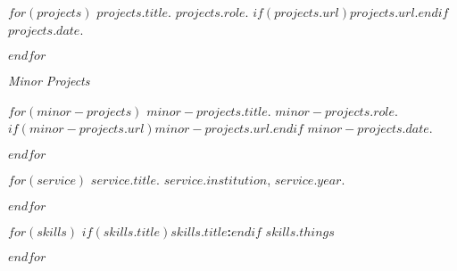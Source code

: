 \documentclass[11pt,article,oneside]{memoir}
\begin{document}
$for(projects)$
\ind \emph{$projects.title$}. $projects.role$. $if(projects.url)$\href{$projects.url$}{$projects.url$}.$endif$ $projects.date$.

\smallskip
$endfor$

\medskip

\ind \emph{Minor Projects}

\smallskip

$for(minor-projects)$
\ind \emph{$minor-projects.title$}. $minor-projects.role$. $if(minor-projects.url)$\href{$minor-projects.url$}{$minor-projects.url$}.$endif$ $minor-projects.date$.
\smallskip

$endfor$

\bigskip
\pagebreak[1]


%
%
%
%
%
%

$for(service)$
\ind $service.title$. $service.institution$, $service.year$.

\pagebreak[1]
$endfor$

\smallskip
\bigskip


$for(skills)$
\ind$if(skills.title)$\textbf{$skills.title$:}$endif$ $skills.things$

\smallskip

\pagebreak[1]
$endfor$

\bigskip

\thispagestyle{jtmcolophon}
\end{document}
